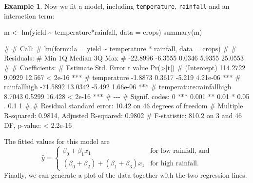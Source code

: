 \documentclass[
  a4paper,
]{article}
\newenvironment{Shaded}{\begin{snugshade}}{\end{snugshade}}
\newcommand{\AttributeTok}[1]{\textcolor[rgb]{0.77,0.63,0.00}{#1}}
\newcommand{\FunctionTok}[1]{\textcolor[rgb]{0.00,0.00,0.00}{#1}}
\newcommand{\NormalTok}[1]{#1}
\newcommand{\OtherTok}[1]{\textcolor[rgb]{0.56,0.35,0.01}{#1}}
\newcommand{\SpecialCharTok}[1]{\textcolor[rgb]{0.00,0.00,0.00}{#1}}
\theoremstyle{definition}
\theoremstyle{definition}
\newtheorem{example}{Example}[section]
\theoremstyle{definition}
\theoremstyle{definition}
\theoremstyle{remark}
\begin{document}
\begin{example}
Now we fit a model, including \texttt{temperature}, \texttt{rainfall} and
an interaction term:

\begin{Shaded}
\begin{Highlighting}[]
\NormalTok{m }\OtherTok{\textless{}{-}} \FunctionTok{lm}\NormalTok{(yield }\SpecialCharTok{\textasciitilde{}}\NormalTok{ temperature}\SpecialCharTok{*}\NormalTok{rainfall, }\AttributeTok{data =}\NormalTok{ crops)}
\FunctionTok{summary}\NormalTok{(m)}
\end{Highlighting}
\end{Shaded}

\begin{Shaded}
\begin{Highlighting}[]
\NormalTok{\# }
\NormalTok{\# Call:}
\NormalTok{\# lm(formula = yield \textasciitilde{} temperature * rainfall, data = crops)}
\NormalTok{\# }
\NormalTok{\# Residuals:}
\NormalTok{\#      Min       1Q   Median       3Q      Max }
\NormalTok{\# {-}22.8996  {-}6.3555   0.0346   5.9355  25.0553 }
\NormalTok{\# }
\NormalTok{\# Coefficients:}
\NormalTok{\#                          Estimate Std. Error t value Pr(\textgreater{}|t|)    }
\NormalTok{\# (Intercept)              114.2722     9.0929  12.567  \textless{} 2e{-}16 ***}
\NormalTok{\# temperature               {-}1.8873     0.3617  {-}5.219 4.21e{-}06 ***}
\NormalTok{\# rainfallhigh             {-}71.5892    13.0342  {-}5.492 1.66e{-}06 ***}
\NormalTok{\# temperature:rainfallhigh   8.7043     0.5299  16.428  \textless{} 2e{-}16 ***}
\NormalTok{\# {-}{-}{-}}
\NormalTok{\# Signif. codes:  0 \textquotesingle{}***\textquotesingle{} 0.001 \textquotesingle{}**\textquotesingle{} 0.01 \textquotesingle{}*\textquotesingle{} 0.05 \textquotesingle{}.\textquotesingle{} 0.1 \textquotesingle{} \textquotesingle{} 1}
\NormalTok{\# }
\NormalTok{\# Residual standard error: 10.42 on 46 degrees of freedom}
\NormalTok{\# Multiple R{-}squared:  0.9814,  Adjusted R{-}squared:  0.9802 }
\NormalTok{\# F{-}statistic: 810.2 on 3 and 46 DF,  p{-}value: \textless{} 2.2e{-}16}
\end{Highlighting}
\end{Shaded}

The fitted values for this model are
\begin{equation*}
  \hat y
  = \begin{cases}
    \beta_0 + \beta_1 x_1 & \mbox{for low rainfall, and} \\
    (\beta_0 + \beta_2) + (\beta_1 + \beta_3) x_1 & \mbox{for high rainfall}.
  \end{cases}
\end{equation*}
Finally, we can generate a plot of the data together
with the two regression lines.


\end{example}
\end{document}
